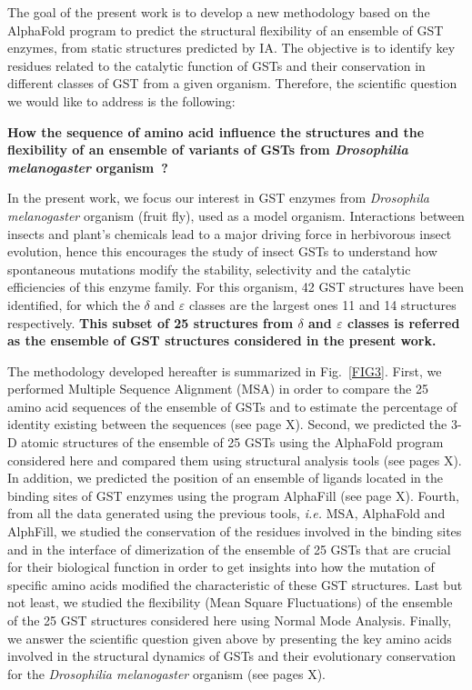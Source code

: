 The goal of the present work is to develop a new methodology based on the AlphaFold program to predict the structural flexibility of an ensemble of GST enzymes, from static structures predicted by IA. The objective is to identify key residues related to the catalytic function of GSTs and their conservation in different classes of GST from a given organism. Therefore, the scientific question we would like to address is the following:

\vspace{.15cm}
\begin{tcolorbox}[width=\textwidth,colback={gray!20!white},title={\textbf{Scientific Question}},outer arc=0mm,colupper=black]    
	\centering
	\textbf{How the sequence of amino acid influence the structures and the flexibility of an ensemble of variants of GSTs from \textit{Drosophilia melanogaster} organism~?}
\end{tcolorbox}

In the present work, we focus our interest in GST enzymes from \textit{Drosophila melanogaster} organism (fruit fly), used as a model organism. Interactions between insects and plant’s chemicals lead to a major driving force in herbivorous insect evolution, hence this encourages the study of insect GSTs to understand how spontaneous mutations modify the stability, selectivity and the catalytic efficiencies of this enzyme family. For this organism, 42 GST structures have been identified\cite{F-Neiers-GSTs}, for which the $\delta$ and $\varepsilon$ classes are the largest ones 11 and 14 structures respectively. \textbf{This subset of 25 structures from $\delta$ and $\varepsilon$ classes is referred as the ensemble of GST structures considered in the present work.}

The methodology developed hereafter is summarized in Fig.~\ref{FIG3}. First, we performed Multiple Sequence Alignment (MSA) in order to compare the 25 amino acid sequences of the ensemble of GSTs and to estimate the percentage of identity existing between the sequences (see page X). Second, we predicted the 3-D atomic structures of the ensemble of 25 GSTs using the AlphaFold program considered here and compared them using structural analysis tools (see pages X). In addition, we predicted the position of an ensemble of ligands located in the binding sites of GST enzymes using the program AlphaFill (see page X). Fourth, from all the data generated using the previous tools, \textit{i.e.} MSA, AlphaFold and AlphFill, we studied the conservation of the residues involved in the binding sites and in the interface of dimerization of the ensemble of 25 GSTs that are crucial for their biological function in order to get insights into how the mutation of specific amino acids modified the characteristic of these GST structures. Last but not least, we studied the flexibility (Mean Square Fluctuations) of the ensemble of the 25 GST structures considered here using Normal Mode Analysis. Finally, we answer the scientific question given above by presenting the key amino acids involved in the structural dynamics of GSTs and their evolutionary conservation for the \textit{Drosophilia melanogaster} organism (see pages X).

